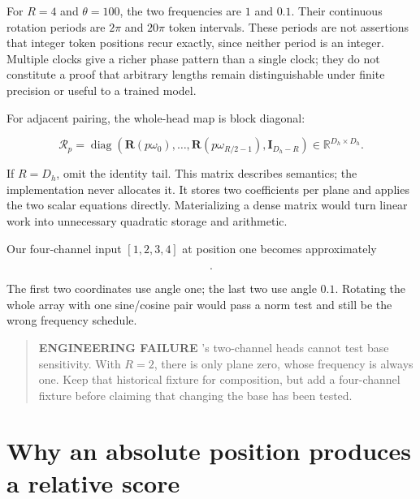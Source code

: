 For \(R=4\) and \(\theta=100\), the two frequencies are \(1\) and
\(0.1\). Their continuous rotation periods are \(2\pi\) and \(20\pi\)
token intervals. These periods are not assertions that integer token
positions recur exactly, since neither period is an integer. Multiple
clocks give a richer phase pattern than a single clock; they do not
constitute a proof that arbitrary lengths remain distinguishable under
finite precision or useful to a trained model.

For adjacent pairing, the whole-head map is block diagonal:

\begin{equation}
\mathcal{R}_p=
\operatorname{diag}\!\left(
\mathbf{R}(p\omega_0),\ldots,
\mathbf{R}(p\omega_{R/2-1}),\mathbf{I}_{D_h-R}\right)
\in\mathbb{R}^{D_h\times D_h}.
\end{equation}

If \(R=D_h\), omit the identity tail. This matrix describes semantics;
the implementation never allocates it. It stores two coefficients per
plane and applies the two scalar equations directly. Materializing a
dense matrix would turn linear work into unnecessary quadratic storage
and arithmetic.

Our four-channel input \([1,2,3,4]\) at position one becomes
approximately

\begin{equation}
[-1.142640,\;1.922076,\;2.585679,\;4.279517].
\end{equation}

The first two coordinates use angle one; the last two use angle \(0.1\).
Rotating the whole array with one sine/cosine pair would pass a norm
test and still be the wrong frequency schedule.

\begin{quote}
\textbf{ENGINEERING FAILURE} 's two-channel heads cannot test
base sensitivity. With \(R=2\), there is only plane zero, whose
frequency is always one. Keep that historical fixture for composition,
but add a four-channel fixture before claiming that changing the base
has been tested.
\end{quote}

\section{Why an absolute position produces a relative
score}\label{why-an-absolute-position-produces-a-relative-score}


